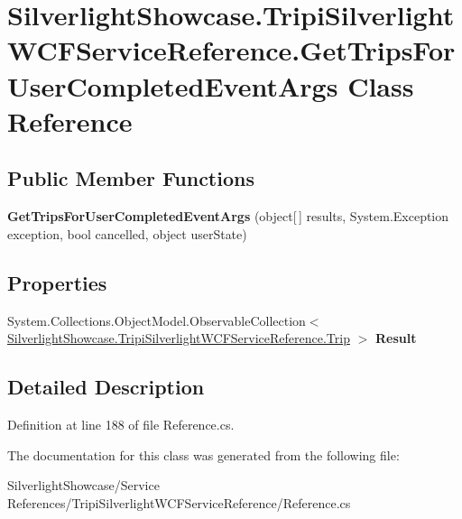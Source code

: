 \hypertarget{class_silverlight_showcase_1_1_tripi_silverlight_w_c_f_service_reference_1_1_get_trips_for_user_completed_event_args}{
\section{SilverlightShowcase.TripiSilverlightWCFServiceReference.GetTripsForUserCompletedEventArgs Class Reference}
\label{class_silverlight_showcase_1_1_tripi_silverlight_w_c_f_service_reference_1_1_get_trips_for_user_completed_event_args}
}
\subsection*{Public Member Functions}
\begin{DoxyCompactItemize}
\item 
\hypertarget{class_silverlight_showcase_1_1_tripi_silverlight_w_c_f_service_reference_1_1_get_trips_for_user_completed_event_args_abd799ac6e9cb2731692621059b0d0aaa}{
{\bfseries GetTripsForUserCompletedEventArgs} (object\mbox{[}$\,$\mbox{]} results, System.Exception exception, bool cancelled, object userState)}
\label{class_silverlight_showcase_1_1_tripi_silverlight_w_c_f_service_reference_1_1_get_trips_for_user_completed_event_args_abd799ac6e9cb2731692621059b0d0aaa}

\end{DoxyCompactItemize}
\subsection*{Properties}
\begin{DoxyCompactItemize}
\item 
\hypertarget{class_silverlight_showcase_1_1_tripi_silverlight_w_c_f_service_reference_1_1_get_trips_for_user_completed_event_args_ab243498831b4029fbf0f93b337ff9e10}{
System.Collections.ObjectModel.ObservableCollection$<$ \hyperlink{class_silverlight_showcase_1_1_tripi_silverlight_w_c_f_service_reference_1_1_trip}{SilverlightShowcase.TripiSilverlightWCFServiceReference.Trip} $>$ {\bfseries Result}}
\label{class_silverlight_showcase_1_1_tripi_silverlight_w_c_f_service_reference_1_1_get_trips_for_user_completed_event_args_ab243498831b4029fbf0f93b337ff9e10}

\end{DoxyCompactItemize}


\subsection{Detailed Description}


Definition at line 188 of file Reference.cs.

The documentation for this class was generated from the following file:\begin{DoxyCompactItemize}
\item 
SilverlightShowcase/Service References/TripiSilverlightWCFServiceReference/Reference.cs\end{DoxyCompactItemize}
